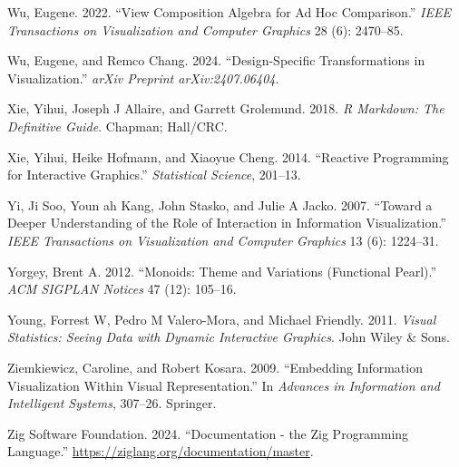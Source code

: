 \documentclass[
]{book}
\newlength{\cslhangindent}
\newenvironment{CSLReferences}[2] %
 {\begin{list}{}{%
  \setlength{\itemindent}{0pt}
  \setlength{\leftmargin}{0pt}
  \setlength{\parsep}{0pt}
  \ifodd #1
   \setlength{\leftmargin}{\cslhangindent}
   \setlength{\itemindent}{-1\cslhangindent}
  \fi
  \setlength{\itemsep}{#2\baselineskip}}}
 {\end{list}}
\theoremstyle{definition}
\theoremstyle{definition}
\theoremstyle{definition}
\theoremstyle{definition}
\theoremstyle{remark}
\begin{document}
\begin{CSLReferences}{1}{0}
Wu, Eugene. 2022. {``View Composition Algebra for Ad Hoc Comparison.''} \emph{IEEE Transactions on Visualization and Computer Graphics} 28 (6): 2470--85.

Wu, Eugene, and Remco Chang. 2024. {``Design-Specific Transformations in Visualization.''} \emph{arXiv Preprint arXiv:2407.06404}.

Xie, Yihui, Joseph J Allaire, and Garrett Grolemund. 2018. \emph{R Markdown: The Definitive Guide}. Chapman; Hall/CRC.

Xie, Yihui, Heike Hofmann, and Xiaoyue Cheng. 2014. {``Reactive Programming for Interactive Graphics.''} \emph{Statistical Science}, 201--13.

Yi, Ji Soo, Youn ah Kang, John Stasko, and Julie A Jacko. 2007. {``Toward a Deeper Understanding of the Role of Interaction in Information Visualization.''} \emph{IEEE Transactions on Visualization and Computer Graphics} 13 (6): 1224--31.

Yorgey, Brent A. 2012. {``Monoids: Theme and Variations (Functional Pearl).''} \emph{ACM SIGPLAN Notices} 47 (12): 105--16.

Young, Forrest W, Pedro M Valero-Mora, and Michael Friendly. 2011. \emph{Visual Statistics: Seeing Data with Dynamic Interactive Graphics}. John Wiley \& Sons.

Ziemkiewicz, Caroline, and Robert Kosara. 2009. {``Embedding Information Visualization Within Visual Representation.''} In \emph{Advances in Information and Intelligent Systems}, 307--26. Springer.

Zig Software Foundation. 2024. {``Documentation - the Zig Programming Language.''} \url{https://ziglang.org/documentation/master}.

\end{CSLReferences}
\end{document}
